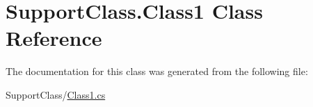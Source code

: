\hypertarget{class_support_class_1_1_class1}{}\section{Support\+Class.\+Class1 Class Reference}
\label{class_support_class_1_1_class1}


The documentation for this class was generated from the following file\+:\begin{DoxyCompactItemize}
\item 
Support\+Class/\hyperlink{_class1_8cs}{Class1.\+cs}\end{DoxyCompactItemize}
